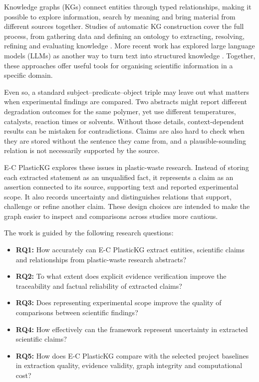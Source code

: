 \documentclass[11pt,a4paper]{article}
\begin{document}
Knowledge graphs (KGs) connect entities through typed relationships, making it possible to explore information, search by meaning and bring material from different sources together. Studies of automatic KG construction cover the full process, from gathering data and defining an ontology to extracting, resolving, refining and evaluating knowledge \citep{hogan2021,paulheim2017,kgconstruction2023}. More recent work has explored large language models (LLMs) as another way to turn text into structured knowledge \citep{ibrahim2024,kgconstruction2025}. Together, these approaches offer useful tools for organising scientific information in a specific domain.

Even so, a standard subject--predicate--object triple may leave out what matters when experimental findings are compared. Two abstracts might report different degradation outcomes for the same polymer, yet use different temperatures, catalysts, reaction times or solvents. Without those details, context-dependent results can be mistaken for contradictions. Claims are also hard to check when they are stored without the sentence they came from, and a plausible-sounding relation is not necessarily supported by the source.

E-C PlasticKG explores these issues in plastic-waste research. Instead of storing each extracted statement as an unqualified fact, it represents a claim as an assertion connected to its source, supporting text and reported experimental scope. It also records uncertainty and distinguishes relations that support, challenge or refine another claim. These design choices are intended to make the graph easier to inspect and comparisons across studies more cautious.

The work is guided by the following research questions:

\begin{itemize}[leftmargin=*]
  \item \textbf{RQ1:} How accurately can E-C PlasticKG extract entities, scientific claims and relationships from plastic-waste research abstracts?
  \item \textbf{RQ2:} To what extent does explicit evidence verification improve the traceability and factual reliability of extracted claims?
  \item \textbf{RQ3:} Does representing experimental scope improve the quality of comparisons between scientific findings?
  \item \textbf{RQ4:} How effectively can the framework represent uncertainty in extracted scientific claims?
  \item \textbf{RQ5:} How does E-C PlasticKG compare with the selected project baselines in extraction quality, evidence validity, graph integrity and computational cost?
\end{itemize}
\end{document}
